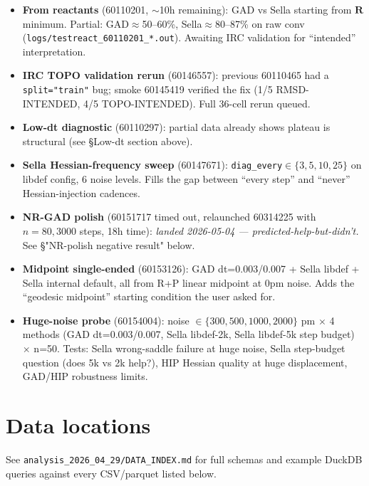 \documentclass[11pt]{article}
\begin{document}
\begin{itemize}[leftmargin=1.5em]
\item \textbf{From reactants} (60110201, $\sim$10h remaining): GAD vs Sella starting from $\textbf{R}$ minimum. Partial: GAD$\approx$50--60\%, Sella$\approx$80--87\% on raw conv (\texttt{logs/testreact\_60110201\_*.out}). Awaiting IRC validation for ``intended'' interpretation.
\item \textbf{IRC TOPO validation rerun} (60146557): previous 60110465 had a \texttt{split="train"} bug; smoke 60145419 verified the fix (1/5 RMSD-INTENDED, 4/5 TOPO-INTENDED). Full 36-cell rerun queued.
\item \textbf{Low-dt diagnostic} (60110297): partial data already shows plateau is structural (see §Low-dt section above).
\item \textbf{Sella Hessian-frequency sweep} (60147671): \texttt{diag\_every}$\in\{3,5,10,25\}$ on libdef config, 6 noise levels. Fills the gap between ``every step'' and ``never'' Hessian-injection cadences.
\item \textbf{NR-GAD polish} (60151717 timed out, relaunched 60314225 with $n{=}80, 3000$ steps, 18h time):
  \emph{landed 2026-05-04 — predicted-help-but-didn't.}
  See §"NR-polish negative result" below.
\item \textbf{Midpoint single-ended} (60153126): GAD dt=0.003/0.007 + Sella libdef + Sella internal default, all from R+P linear midpoint at 0pm noise. Adds the ``geodesic midpoint'' starting condition the user asked for.
\item \textbf{Huge-noise probe} (60154004): noise $\in\{300, 500, 1000, 2000\}$ pm $\times$ 4 methods (GAD dt=0.003/0.007, Sella libdef-2k, Sella libdef-5k step budget) $\times$ n=50. Tests: Sella wrong-saddle failure at huge noise, Sella step-budget question (does 5k vs 2k help?), HIP Hessian quality at huge displacement, GAD/HIP robustness limits.
\end{itemize}

\newpage
\section{Data locations}

See \texttt{analysis\_2026\_04\_29/DATA\_INDEX.md} for full schemas and
example DuckDB queries against every CSV/parquet listed below.
\end{document}
